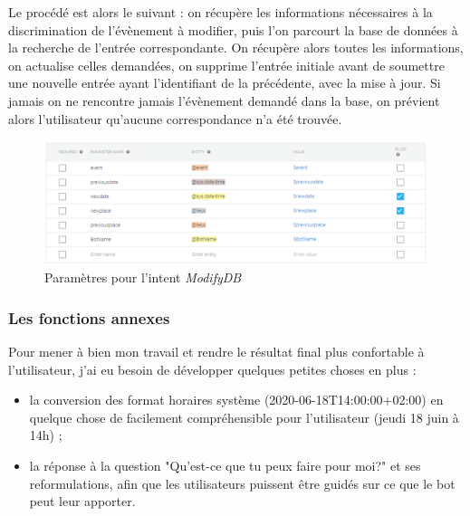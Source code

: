 \documentclass[stage2a]{tnreport} %
\begin{document}
Le procédé est alors le suivant : on récupère les informations nécessaires à la discrimination de l'évènement à modifier, puis l'on parcourt la base de données à la recherche de l'entrée correspondante. On récupère alors toutes les informations, on actualise celles demandées, on supprime l'entrée initiale avant de soumettre une nouvelle entrée ayant l'identifiant de la précédente, avec la mise à jour. Si jamais on ne rencontre jamais l'évènement demandé dans la base, on prévient alors l'utilisateur qu'aucune correspondance n'a été trouvée.



\begin{figure}[h!]
    \centering
    \includegraphics[width=\textwidth]{figures/MDBparam.PNG}
    \caption{Paramètres pour l'intent \emph{ModifyDB}}
    \label{modifyParam}
\end{figure}

\vspace{\linewidth}

\subsubsection{Les fonctions annexes}

Pour mener à bien mon travail et rendre le résultat final plus confortable à l'utilisateur, j'ai eu besoin de développer quelques petites choses en plus :\\
\begin{itemize}
    \item la conversion des format horaires système (2020-06-18T14:00:00+02:00) en quelque chose de facilement compréhensible pour l'utilisateur (jeudi 18 juin à 14h) ;
    \item la réponse à la question "Qu'est-ce que tu peux faire pour moi?" et ses reformulations, afin que les utilisateurs puissent être guidés sur ce que le bot peut leur apporter.\\
\end{itemize}

\vspace{13\baselineskip}
\end{document}
